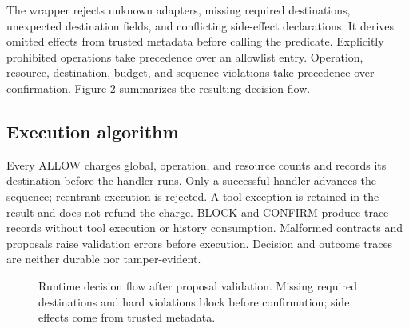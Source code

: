 \documentclass[conference,letterpaper]{IEEEtran}
\begin{document}
The wrapper rejects unknown adapters, missing required destinations, unexpected destination fields, and conflicting side-effect declarations. It derives omitted effects from trusted metadata before calling the predicate. Explicitly prohibited operations take precedence over an allowlist entry. Operation, resource, destination, budget, and sequence violations take precedence over confirmation. Figure 2 summarizes the resulting decision flow.


\subsection{Execution algorithm}

Every ALLOW charges global, operation, and resource counts and records its destination before the handler runs. Only a successful handler advances the sequence; reentrant execution is rejected. A tool exception is retained in the result and does not refund the charge. BLOCK and CONFIRM produce trace records without tool execution or history consumption. Malformed contracts and proposals raise validation errors before execution. Decision and outcome traces are neither durable nor tamper-evident.


\begin{figure}[ht]
\centering
{}
\caption{Runtime decision flow after proposal validation. Missing required destinations and hard violations block before confirmation; side effects come from trusted metadata.}
\end{figure}
\end{document}
